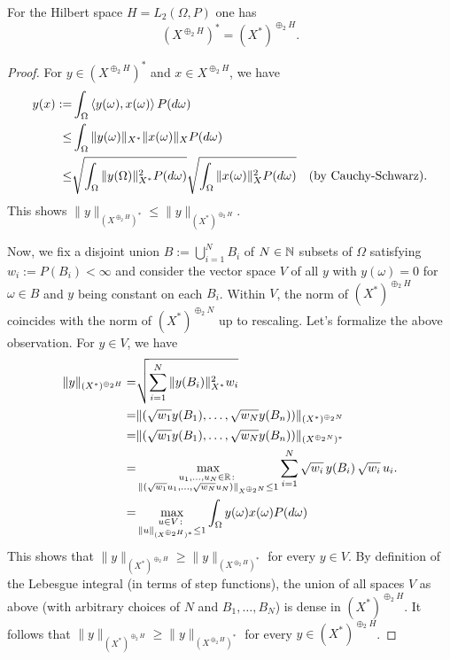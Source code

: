 \newcommand{\lhs}{(X^{\oplus_2 H})^\ast}
\newcommand{\rhs}{(X^\ast)^{\oplus_2 H}}
\begin{prop} 
	For the Hilbert space $H = L_2(\Omega,P)$ one has 
	\[
		\lhs = \rhs.
	\]
\end{prop} 
\begin{proof} 
	For $y \in \lhs$ and $x \in X^{\oplus_2 H}$, we have  
	\begin{align*} 
		y(x):= & \int_{\Omega} \left\langle y(\omega) , x(\omega) \right\rangle P(d \omega) 
	\\	 \le & \int_{\Omega} \|y(\omega)\|_{X^\ast} \|x(\omega)\|_{X} P(d \omega) 
	\\ \le & \sqrt{\int_\Omega \|y(\Omega) \|_{X^\ast}^2 P(d \omega) } \sqrt{\int_\Omega \|x(\omega)\|_X^2 P(d \omega)} & \text{(by Cauchy-Schwarz)}. 
	\end{align*}
	This shows $\|y \|_{\lhs} \le \|y\|_{\rhs}$. 
	
	Now, we fix a disjoint union $B:=\bigcup_{i=1}^N B_i$ of $N \in \mathbb{N}$ subsets of $\Omega$ satisfying $w_i :=P(B_i) < \infty$ and consider the vector space $V$ of all $y$ with $y(\omega) = 0$ for $\omega \in B$ and $y$ being constant on each $B_i$. Within $V$, the norm of $\rhs$ coincides with the norm of $(X^\ast)^{\oplus_2 N}$ up to rescaling. Let's formalize the above observation. For $y \in V$, we have 
	\begin{align*} 
		\| y\|_{\rhs} = &  \sqrt{ \sum_{i=1}^N \| y(B_i) \|_{X^\ast}^2 w_i }
		\\ = & \| ( \sqrt{w_1} y(B_1),\ldots, \sqrt{w_N} y(B_n) ) \|_{(X^\ast)^{\oplus_2 N}} 
		\\ = & \| ( \sqrt{w_1} y(B_1),\ldots, \sqrt{w_N} y(B_n) ) \|_{(X^{\oplus_2 N } )^\ast}  
		\\ = & \max_{ \substack{ u_1,\ldots,u_N \in \R \colon  \\ \| (\sqrt{w_1} u_1,\ldots, \sqrt{w_N} u_N) \|_{X^{\oplus_2 N}} \le 1}} \sum_{i=1}^N \sqrt{w_i} \, y(B_i) \, \sqrt{w_i} \, u_i. 
		\\ = & \max_{\substack{ u \in V \colon \\ \|u\|_{\lhs} \le 1}} \int_{\Omega} y(\omega) x(\omega) P( d \omega) 
	\end{align*} 
	This shows that $\|y\|_{\rhs} \ge \|y\|_{\lhs}$ for every $y \in V$.  
	By definition of the Lebesgue integral (in terms of step functions), the union of all spaces $V$ as above (with arbitrary choices of $N$ and $B_1,\ldots,B_N$) is dense in $\rhs$. It follows that $\|y \|_{\rhs} \ge \|y \|_{\lhs}$ for every $y \in \rhs$. 
\end{proof} 



